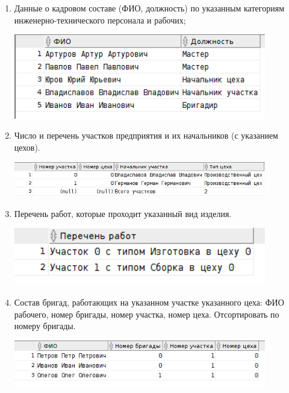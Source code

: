 \begin{enumerate}
    \item Данные о кадровом составе (ФИО, должность) по указанным категориям инженерно-технического персонала и рабочих;

    

    \includegraphics[width=11cm]{./screenshots/results/result3.png}

    \item Число и перечень участков предприятия и их начальников (с указанием цехов).

    

    \includegraphics[width=11cm]{./screenshots/results/result4.png}

    \item Перечень работ, которые проходит указанный вид изделия.

    

    \includegraphics[width=11cm]{./screenshots/results/result5.png}

    \item Состав бригад, работающих на указанном участке указанного цеха: ФИО рабочего, номер бригады, номер участка, номер цеха. Отсортировать по номеру бригады.

    

    \includegraphics[width=11cm]{./screenshots/results/result6.png}


\end{enumerate}
